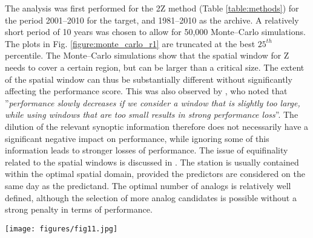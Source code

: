 \documentclass[review]{elsarticle}
\begin{document}
The analysis was first performed for the 2Z method (Table \ref{table:methods}) for the period 2001--2010 for the target, and 1981--2010 as the archive. A relatively short period of 10 years was chosen to allow for 50,000 Monte--Carlo simulations. The plots in Fig. \ref{figure:monte_carlo_r1} are truncated at the best $25^{th}$ percentile. The Monte--Carlo simulations show that the spatial window for Z needs to cover a certain region, but can be larger than a critical size. The extent of the spatial window can thus be substantially different without significantly affecting the performance score. This was also observed by \citet{Bontron2004}, who noted that ''\textit{performance slowly decreases if we consider a window that is slightly too large, while using windows that are too small results in strong performance loss}''. The dilution of the relevant synoptic information therefore does not necessarily have a significant negative impact on performance, while ignoring some of this information leads to stronger losses of performance. The issue of equifinality related to the spatial windows is discussed in \cite{Radanovics2013}. The station is usually contained within the optimal spatial domain, provided the predictors are considered on the same day as the predictand. The optimal number of analogs is relatively well defined, although the selection of more analog candidates is possible without a strong penalty in terms of performance.

\begin{figure*}[hbt!]
	\texttt{[image: figures/fig11.jpg]}
	\caption{Example of parameter values for 2Z (Table \ref{table:methods}) for the precipitation at the Binn station (Fig. \ref{figure:variable_exploration}) on the period 2001--2010. The parameters are the extent (min/max longitude/latitude) of the spatial windows for the geopotential height at 500 and 1000~hPa, and the number of analogs. The green vertical bar in the plots represents the location of the station. The circles represent random parameters from the Monte--Carlo analysis. The plots are truncated at the $25^{th}$ best percentiles for 50,000 realizations. Squares are the results of the sequential calibration and triangles result from genetic algorithms. Markers in blue represent parameters optimized for the period 1981--2000 and applied to 2001--2010. Markers in red represent parameters optimized directly for the period 2001--2010.}
	\label{figure:monte_carlo_r1}
\end{figure*}
\end{document}
